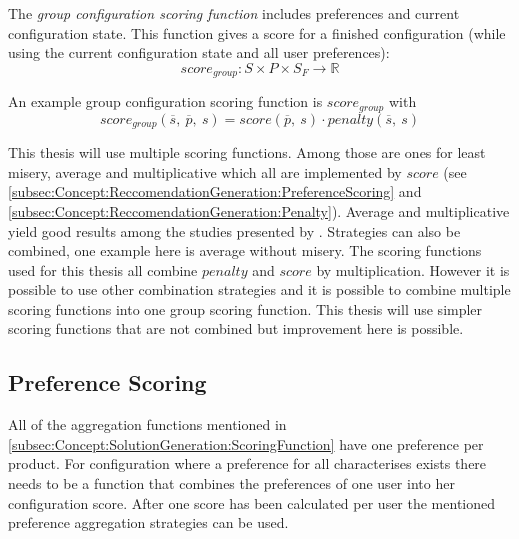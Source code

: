 \label{subsec:Concept:SolutionGeneration:ScoringFunction}

The \emph{group configuration scoring function} includes preferences and current configuration state. This function gives a score for a finished configuration (while using the current configuration state and all user preferences):
\begin{equation}
    score_{group}: S \times P \times S_F \to \mathbb{R}
\end{equation}

An example group configuration scoring function is $score_{group}$ with
\begin{equation}
    score_{group}(\overline{s},\ \overline{p},\ s) = score(\overline{p},\ s) \cdot penalty(\overline{s},\ s)
\end{equation} 

This thesis will use multiple scoring functions. Among those are ones for least misery, average and multiplicative which all are implemented by $score$ (see \autoref{subsec:Concept:ReccomendationGeneration:PreferenceScoring} and \autoref{subsec:Concept:ReccomendationGeneration:Penalty}). Average and multiplicative yield good results among the studies presented by \citeauthor{Masthoff2015} \cite{Masthoff2015}. Strategies can also be combined, one example here is average without misery. The scoring functions used for this thesis all combine $penalty$ and $score$ by multiplication. However it is possible to use other combination strategies and it is possible to combine multiple scoring functions into one group scoring function. This thesis will use simpler scoring functions that are not combined but improvement here is possible.

\subsection{Preference Scoring}
\label{subsec:Concept:ReccomendationGeneration:PreferenceScoring}

All of the aggregation functions mentioned in \autoref{subsec:Concept:SolutionGeneration:ScoringFunction} have one preference per product. For configuration where a preference for all characterises exists there needs to be a function that combines the preferences of one user into her configuration score. After one score has been calculated per user the mentioned preference aggregation strategies can be used.

